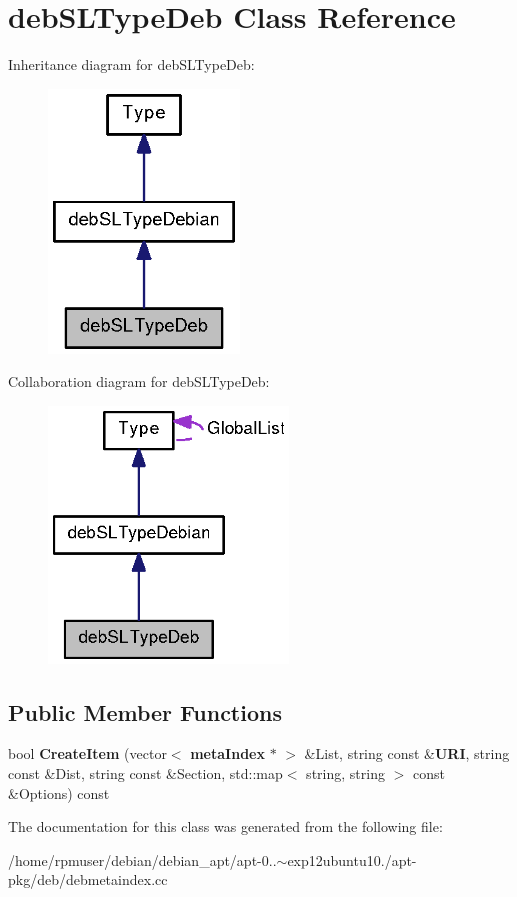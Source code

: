 \section{deb\-S\-L\-Type\-Deb \-Class \-Reference}
\label{classdebSLTypeDeb}


\-Inheritance diagram for deb\-S\-L\-Type\-Deb\-:
\nopagebreak
\begin{figure}[H]
\begin{center}
\leavevmode
\includegraphics[width=144pt]{classdebSLTypeDeb__inherit__graph}
\end{center}
\end{figure}


\-Collaboration diagram for deb\-S\-L\-Type\-Deb\-:
\nopagebreak
\begin{figure}[H]
\begin{center}
\leavevmode
\includegraphics[width=181pt]{classdebSLTypeDeb__coll__graph}
\end{center}
\end{figure}
\subsection*{\-Public \-Member \-Functions}
\begin{DoxyCompactItemize}
\item 
bool {\bfseries \-Create\-Item} (vector$<$ {\bf meta\-Index} $\ast$ $>$ \&\-List, string const \&{\bf \-U\-R\-I}, string const \&\-Dist, string const \&\-Section, std\-::map$<$ string, string $>$ const \&\-Options) const \label{classdebSLTypeDeb_a8776fe2f559ba3004185193a04c1a974}

\end{DoxyCompactItemize}


\-The documentation for this class was generated from the following file\-:\begin{DoxyCompactItemize}
\item 
/home/rpmuser/debian/debian\-\_\-apt/apt-\/0..$\sim$exp12ubuntu10./apt-\/pkg/deb/debmetaindex.\-cc\end{DoxyCompactItemize}
